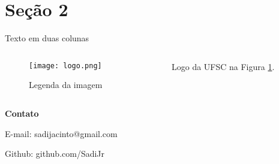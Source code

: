 \documentclass[t]{beamer}
\begin{document}
\section{Seção 2}

\begin{frame}{Texto em duas colunas}
	\begin{columns}[c]
		\begin{column}{.5\textwidth}
			\begin{figure}[!ht]
				\centering
				\texttt{[image: logo.png]}
				\caption{Legenda da imagem}
				\label{fig:rotulo}
			\end{figure}
		\end{column}
		\begin{column}{.5\textwidth}
			Logo da UFSC na Figura \ref{fig:rotulo}.
		\end{column}
	\end{columns}
\end{frame}

{
	\begin{frame}[plain]
		\vspace{15mm}
		\begin{center}
			\textcolor{cinza}{
				\textbf{Contato}
			}
		\end{center}
		\vspace{-6mm}
		\begin{center}
			\textcolor{cinza}{\scriptsize{
				E-mail: sadijacinto@gmail.com
			}}
		\end{center}
		\vspace{-6mm}
		\begin{center}
			\textcolor{cinza}{\scriptsize{
				Github: github.com/SadiJr
			}}
		\end{center}
	\end{frame}
}
\end{document}
